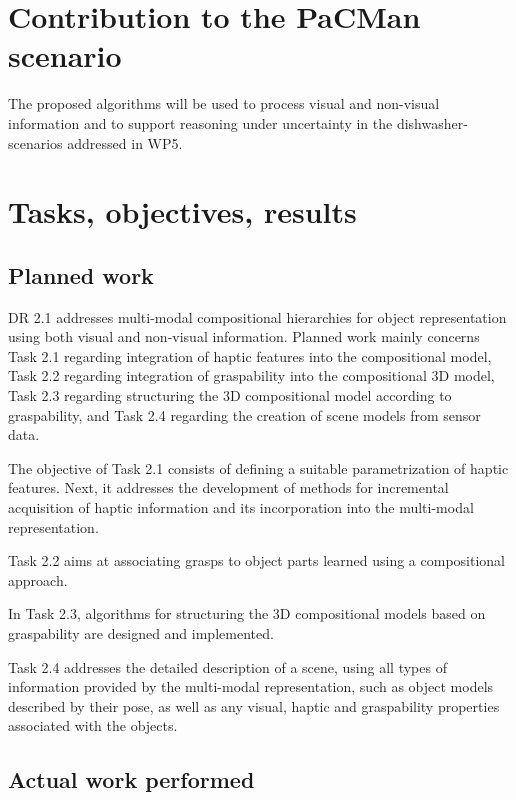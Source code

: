 \documentclass[a4paper,11pt,pdf]{../templates/pacmanreport}
\begin{document}
\section*{Contribution to the PaCMan scenario}

The proposed algorithms will be used to process visual and non-visual information and to support reasoning under uncertainty in the dishwasher-scenarios addressed in WP5.

\newpage

\section{Tasks, objectives, results}

\subsection{Planned work}

DR 2.1 addresses multi-modal compositional hierarchies for object representation using both visual and non-visual information. Planned work mainly concerns Task 2.1 regarding integration of haptic features into the compositional model, Task 2.2 regarding integration of graspability into the compositional 3D model, Task 2.3 regarding structuring the 3D compositional model according to graspability, and Task 2.4 regarding the creation of scene models from sensor data.

The objective of Task 2.1 consists of defining a suitable parametrization of haptic features. Next, it addresses the development of methods for incremental acquisition of haptic information and its incorporation into the multi-modal representation. 

Task 2.2 aims at associating grasps to object parts learned using a compositional approach.

In Task 2.3, algorithms for structuring the 3D compositional models based on graspability are designed and implemented.

Task 2.4 addresses the detailed description of a scene, using all types of information provided by the multi-modal representation, such
as object models described by their pose, as well as any visual, haptic and graspability properties associated with the objects.

\subsection{Actual work performed}
\end{document}
